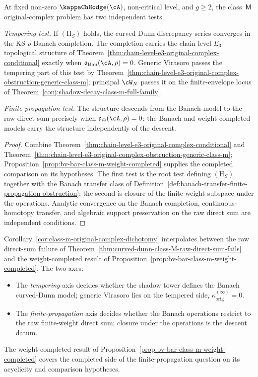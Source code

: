 \begin{corollary}
\label{cor:class-m-original-complex-dichotomy}
At fixed non-zero $\kappaChHodge(\cA)$, non-critical level, and $g\ge 2$,
the class~$\mathsf{M}$ original-complex problem has two independent
tests.

\emph{Tempering test.} If $(\mathrm{H}_S)$ holds, the curved-Dunn
discrepancy series converges in the KS-$\rho$ Banach completion. The
completion carries the chain-level $E_3$-topological structure of
Theorem~\ref{thm:chain-level-e3-original-complex-conditional} exactly
when $\mathfrak{o}_{\mathrm{Ban}}(\cA,\rho)=0$. Generic Virasoro passes
the tempering part of this test by
Theorem~\ref{thm:chain-level-e3-original-complex-obstruction-generic-class-m};
principal $\cW_N$ passes it on the finite-envelope locus of
Theorem~\ref{conj:shadow-decay-class-m-full-family}.

\emph{Finite-propagation test.} The structure descends from the
Banach model to the raw direct sum precisely when
$\mathfrak{o}_{\oplus}(\cA,\rho)=0$; the Banach and weight-completed
models carry the structure independently of the descent.
\end{corollary}

\begin{proof}
Combine
Theorem~\ref{thm:chain-level-e3-original-complex-conditional} and
Theorem~\ref{thm:chain-level-e3-original-complex-obstruction-generic-class-m};
Proposition~\ref{prop:bv-bar-class-m-weight-completed} supplies the
completed comparison on its hypotheses. The first test is the root
test defining $(\mathrm{H}_S)$ together with the Banach transfer
class of
Definition~\ref{def:banach-transfer-finite-propagation-obstruction};
the second is closure of the finite-weight subspace under the
operations. Analytic convergence on the Banach completion,
continuous-homotopy transfer, and algebraic support preservation on
the raw direct sum are independent conditions.
\end{proof}

\begin{remark}
\label{rem:relation-to-weight-completion-original}
Corollary~\ref{cor:class-m-original-complex-dichotomy} interpolates
between the raw direct-sum failure of
Theorem~\ref{thm:curved-dunn-class-M-raw-direct-sum-fails} and the
weight-completed result of
Proposition~\ref{prop:bv-bar-class-m-weight-completed}. The two axes:
\begin{itemize}
\item The \emph{tempering} axis decides whether the shadow tower
 defines the Banach curved-Dunn model; generic Virasoro lies on
 the tempered side, $\kappa^{(\infty)}_{\mathrm{orig}}=0$.
\item The \emph{finite-propagation} axis decides whether the Banach
 operations restrict to the raw finite-weight direct sum; closure
 under the operations is the descent datum.
\end{itemize}
The weight-completed result of
Proposition~\ref{prop:bv-bar-class-m-weight-completed} covers the
completed side of the finite-propagation question on its acyclicity and
comparison hypotheses.
\end{remark}

